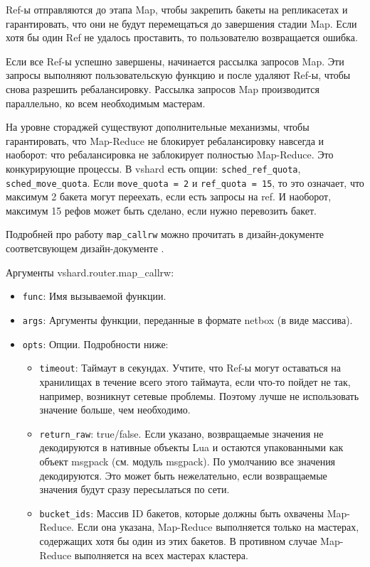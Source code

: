 Ref-ы отправляются до этапа Map, чтобы закрепить бакеты на репликасетах и
гарантировать, что они не будут перемещаться до завершения стадии Map. Если
хотя бы один Ref не удалось проставить, то пользователю возвращается ошибка.

Если все Ref-ы успешно завершены, начинается рассылка запросов Map. Эти запросы
выполняют пользовательскую функцию и после удаляют Ref-ы, чтобы снова разрешить
ребалансировку. Рассылка запросов Map производится параллельно, ко всем
необходимым мастерам.

На уровне стораджей существуют дополнительные механизмы, чтобы гарантировать,
что Map-Reduce не блокирует ребалансировку навсегда и наоборот: что
ребалансировка не заблокирует полностью Map-Reduce. Это конкурирующие процессы.
В vshard есть опции: \texttt{sched_ref_quota}, \texttt{sched_move_quota}. Если
\texttt{move_quota = 2} и \texttt{ref_quota = 15}, то это означает, что
максимум 2 бакета могут переехать, если есть запросы на ref. И наоборот,
максимум 15 рефов может быть сделано, если нужно перевозить бакет.

Подробней про работу \texttt{map_callrw} можно прочитать в дизайн-документе
соответсвующем дизайн-документе \cite{MapCallrwRfc}.

Аргументы vshard.router.map_callrw:

\begin{itemize}
\item \texttt{func}: Имя вызываемой функции.
\item \texttt{args}: Аргументы функции, переданные в формате netbox (в виде
    массива).
\item \texttt{opts}: Опции. Подробности ниже:
\begin{itemize}
\item \texttt{timeout}: Таймаут в секундах. Учтите, что Ref-ы могут оставаться
    на хранилищах в течение всего этого таймаута, если что-то пойдет не так,
        например, возникнут сетевые проблемы. Поэтому лучше не использовать
        значение больше, чем необходимо.
\item \texttt{return_raw}: true/false. Если указано, возвращаемые значения не
    декодируются в нативные объекты Lua и остаются упакованными как объект
        msgpack (см. модуль msgpack). По умолчанию все значения декодируются.
        Это может быть нежелательно, если возвращаемые значения будут сразу
        пересылаться по сети.
\item \texttt{bucket_ids}: Массив ID бакетов, которые должны быть охвачены
    Map-Reduce. Если она указана, Map-Reduce выполняется только на мастерах,
        содержащих хотя бы один из этих бакетов. В противном случае Map-Reduce
        выполняется на всех мастерах кластера.
\end{itemize}
\end{itemize}

